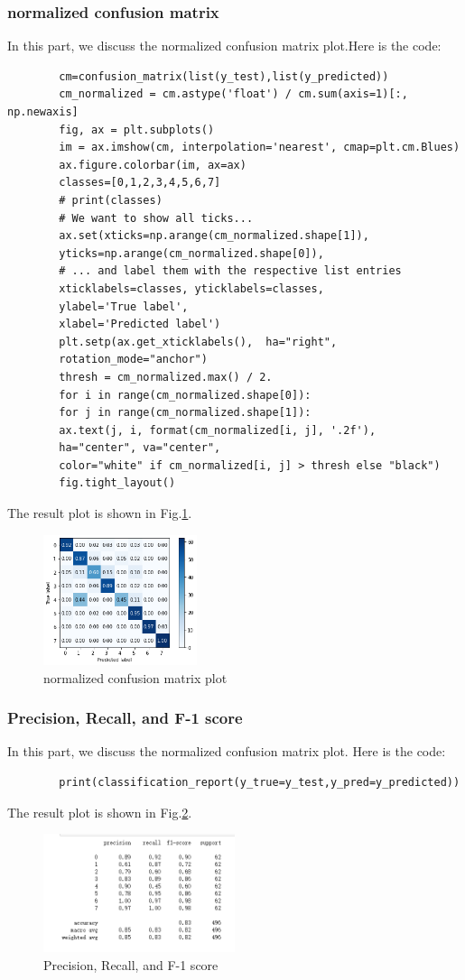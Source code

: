 \documentclass[conference]{IEEEtran}
\begin{document}
	\subsubsection{normalized confusion matrix}
	In this part, we discuss the normalized confusion matrix plot.Here is the code:
	\begin{lstlisting}
		cm=confusion_matrix(list(y_test),list(y_predicted))
		cm_normalized = cm.astype('float') / cm.sum(axis=1)[:, np.newaxis]
		fig, ax = plt.subplots()
		im = ax.imshow(cm, interpolation='nearest', cmap=plt.cm.Blues)
		ax.figure.colorbar(im, ax=ax)
		classes=[0,1,2,3,4,5,6,7]
		# print(classes)
		# We want to show all ticks...
		ax.set(xticks=np.arange(cm_normalized.shape[1]),
		yticks=np.arange(cm_normalized.shape[0]),
		# ... and label them with the respective list entries
		xticklabels=classes, yticklabels=classes,
		ylabel='True label',
		xlabel='Predicted label')
		plt.setp(ax.get_xticklabels(),  ha="right",
		rotation_mode="anchor")
		thresh = cm_normalized.max() / 2.
		for i in range(cm_normalized.shape[0]):
		for j in range(cm_normalized.shape[1]):
		ax.text(j, i, format(cm_normalized[i, j], '.2f'),
		ha="center", va="center",
		color="white" if cm_normalized[i, j] > thresh else "black")
		fig.tight_layout()
	\end{lstlisting}
	The result plot is shown in Fig.\ref{Fig.t3q1c}.
	\begin{figure}[h] 
		\centering
		\includegraphics[width=0.4\textwidth]{T3Q1c.png}
		\caption{normalized confusion matrix plot} 
		\label{Fig.t3q1c} 
	\end{figure}
	
	\subsubsection{Precision, Recall, and F-1 score}
	In this part, we discuss the normalized confusion matrix plot. Here is the code:
	\begin{lstlisting}
		print(classification_report(y_true=y_test,y_pred=y_predicted))
	\end{lstlisting}
	The result plot is shown in Fig.\ref{Fig.t3q1d}.
	\begin{figure}[h] 
		\centering
		\includegraphics[width=0.5\textwidth]{T3Q1d.png}
		\caption{Precision, Recall, and F-1 score} 
		\label{Fig.t3q1d} 
	\end{figure}
	
\end{document}
